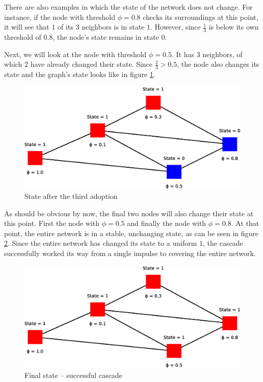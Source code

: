\documentclass{sig-alternate-05-2015}
\begin{document}
There are also examples in which the state of the network does not change. For instance, if the node with threshold $\phi = 0.8$ checks its surroundings at this point, it will see that $1$ of its $3$ neighbors is in state $1$. However, since $\frac{1}{3}$ is below its own threshold of $0.8$, the node's state remains in state $0$.

Next, we will look at the node with threshold $\phi = 0.5$. It has $3$ neighbors, of which $2$ have already changed their state. Since $\frac{2}{3} > 0.5$, the node also changes its state and the graph's state looks like in figure \ref{fig:model4}.

\begin{figure}[h!]
    \includegraphics[width=\columnwidth]{../presentation/img/model7}
    \centering
    \caption{State after the third adoption}
    \label{fig:model4}
\end{figure}

As should be obvious by now, the final two nodes will also change their state at this point. First the node with $\phi = 0.5$ and finally the node with $\phi = 0.8$. At that point, the entire network is in a stable, unchanging state, as can be seen in figure \ref{fig:model5}. Since the entire network has changed its state to a uniform $1$, the cascade successfully worked its way from a single impulse to covering the entire network.

\begin{figure}[h!]
    \includegraphics[width=\columnwidth]{../presentation/img/model9}
    \centering
    \caption{Final state -- successful cascade}
    \label{fig:model5}
\end{figure}
\end{document}
